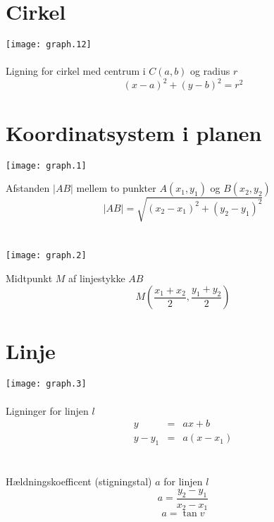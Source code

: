 \documentclass[11pt,a5paper,fleqn,leqno]{book}
\begin{document}
\section{Cirkel}

\texttt{[image: graph.12]}
\\
\\
Ligning for cirkel med centrum i $C(a,b)$ og radius $r$
\begin{equation} \label{eq:cirkel_ligning}
(x-a)^2 + (y-b)^2 = r^2
\end{equation}

\newpage

\section{Koordinatsystem i planen}

\texttt{[image: graph.1]}

Afstanden $|AB|$ mellem to punkter $A(x_1,y_1)$ og $B(x_2,y_2)$
\begin{equation}
|AB| = \sqrt{(x_2-x_1)^2 + (y_2-y_1)^2}
\end{equation}
\\
\\
\texttt{[image: graph.2]}

Midtpunkt $M$ af linjestykke $AB$
\begin{equation}
M\left(\frac{x_1+x_2}{2},\frac{y_1+y_2}{2}\right)
\end{equation}

\vfill

\section{Linje}

\texttt{[image: graph.3]}
\\
\\
Ligninger for linjen $l$
\begin{eqnarray} \label{eq:linje_ligning}
y     & = & ax+b \\
y-y_1 & = & a(x-x_1) \nonumber
\end{eqnarray}
\\
\\
Hældningskoefficent (stigningstal) $a$ for linjen $l$
\begin{equation} \label{eq:linje_haeldning}
a = \frac{y_2 - y_1}{x_2 - x_1}
\end{equation}
\begin{equation}
a = \tan v
\end{equation}
\end{document}
